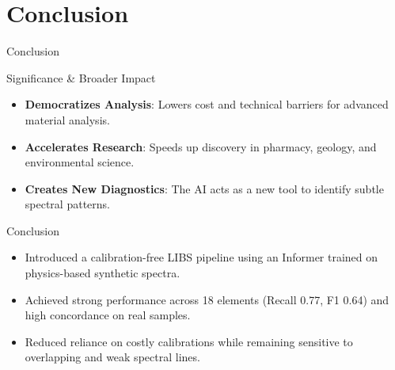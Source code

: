 \documentclass{beamer}
\begin{document}
\section{Conclusion}

\begin{frame}{Conclusion}
  \small
  \begin{alertblock}{Significance \& Broader Impact}
    \begin{itemize}\setlength{\itemsep}{2pt}\setlength{\parskip}{0pt}
      \item \textbf{Democratizes Analysis}: Lowers cost and technical barriers for advanced material analysis.
      \item \textbf{Accelerates Research}: Speeds up discovery in pharmacy, geology, and environmental science.
      \item \textbf{Creates New Diagnostics}: The AI acts as a new tool to identify subtle spectral patterns.
    \end{itemize}
  \end{alertblock}

  \vspace{0.4em}

  \begin{block}{Conclusion}
    \begin{itemize}\setlength{\itemsep}{2pt}\setlength{\parskip}{0pt}
      \item Introduced a calibration-free LIBS pipeline using an Informer trained on physics-based synthetic spectra.
      \item Achieved strong performance across 18 elements (Recall 0.77, F1 0.64) and high concordance on real samples.
      \item Reduced reliance on costly calibrations while remaining sensitive to overlapping and weak spectral lines.
    \end{itemize}
  \end{block}

\end{frame}
\end{document}
